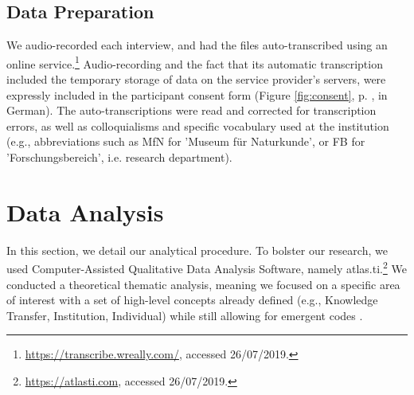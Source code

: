 \documentclass{article}
\begin{document}
\subsection{Data Preparation}
We audio-recorded each interview, and had the files auto-transcribed using an online service.\footnote{\url{https://transcribe.wreally.com/}, accessed 26/07/2019.} Audio-recording and the fact that its automatic transcription included the temporary storage of data on the service provider's servers, were expressly included in the participant consent form (Figure \ref{fig:consent}, p. \pageref{fig:consent}, in German). The auto-transcriptions were read and corrected for transcription errors, as well as colloquialisms and specific vocabulary used at the institution (e.g., abbreviations such as MfN for 'Museum f\"ur Naturkunde', or FB for 'Forschungsbereich', i.e. research department). 

\section{Data Analysis}
In this section, we detail our analytical procedure. To bolster our research, we used Computer-Assisted Qualitative Data Analysis Software, namely atlas.ti.\footnote{\url{https://atlasti.com}, accessed 26/07/2019.} We conducted a theoretical thematic analysis, meaning we focused on a specific area of interest with a set of high-level concepts already defined (e.g., Knowledge Transfer, Institution, Individual) while still allowing for emergent codes \cite{friese_theme_2016}.
\end{document}
